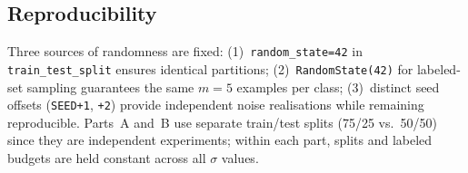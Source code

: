 \documentclass[10pt, letterpaper]{article}
\begin{document}
\subsection{Reproducibility}

Three sources of randomness are fixed:
(1)~\texttt{random\_state=42} in \texttt{train\_test\_split} ensures identical partitions;
(2)~\texttt{RandomState(42)} for labeled-set sampling guarantees the same $m{=}5$ examples per class;
(3)~distinct seed offsets (\texttt{SEED+1}, \texttt{+2}) provide independent noise realisations while remaining reproducible.
Parts~A and~B use separate train/test splits (75/25 vs.\ 50/50) since they are independent experiments; within each part, splits and labeled budgets are held constant across all $\sigma$ values.
\end{document}
